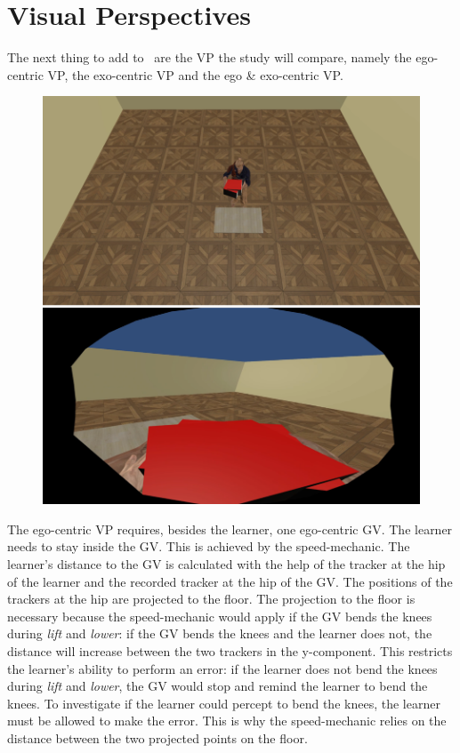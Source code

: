 \section{Visual Perspectives}
\label{sec:perspectives}
The next thing to add to \exgo\ are the VP the study will compare, namely the ego-centric VP, the exo-centric VP and the ego \& exo-centric VP.\\
\begin{figure}[htb]
	\centering
	\includegraphics[width=\textwidth]{figures/perspectiveEGO.png}
	\caption[]{}
	\label{fig:ego}
\end{figure}
The ego-centric VP requires, besides the learner, one ego-centric GV. The learner needs to stay inside the GV. This is achieved by the speed-mechanic. The learner's distance to the GV is calculated with the help of the tracker at the hip of the learner and the recorded tracker at the hip of the GV. The positions of the trackers at the hip are projected to the floor. The projection to the floor is necessary because the speed-mechanic would apply if the GV bends the knees during \textit{lift} and \textit{lower}: if the GV bends the knees and the learner does not, the distance will increase between the two trackers in the y-component. This restricts the learner's ability to perform an error: if the learner does not bend the knees during \textit{lift} and \textit{lower}, the GV would stop and remind the learner to bend the knees. To investigate if the learner could percept to bend the knees, the learner must be allowed to make the error. This is why the speed-mechanic relies on the distance between the two projected points on the floor.\\
